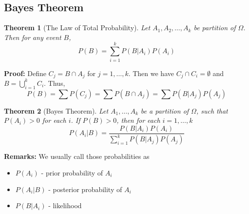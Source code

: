 \documentclass[11pt]{article}
\newtheorem{theorem}{Theorem}[section]
\begin{document}
\subsection{Bayes Theorem}
\begin{theorem}[The Law of Total Probability]
Let $A_1, A_2, \dots, A_k$ be partition of $\Omega$. Then
for any event $B$,
\[P(B) = \sum_{i=1}^k P(B|A_i)P(A_i)\]
\end{theorem}
{\bf Proof: } Define $C_j = B\cap A_j$ for $j = 1, \dots, k$.
Then we have $C_j \cap C_i = \emptyset$ and $B = \bigcup_{i = 1}^k C_i$.
Thus,\[P(B) = \sum P(C_j) = \sum P(B\cap A_j) = \sum P(B|A_j)P(A_j)\]

\begin{theorem}[Bayes Theorem]
Let $A_1, \dots, A_k$ be a partition of $\Omega$, such that $P(A_i) > 0$ for each $i$.
If $P(B) > 0$, then for each $i = 1, \dots, k$
\[P(A_i|B) = \frac{P(B|A_i)P(A_i)}{\sum_{i=1}^kP(B|A_j)P(A_j)}\]
\end{theorem}
{\bf Remarks:} We usually call those probabilities as
\begin{itemize}
\item $P(A_i)$ - prior probability of $A_i$
\item $P(A_i|B)$ - posterior probability of $A_i$
\item $P(B|A_i)$ - likelihood
\end{itemize}
\end{document}

